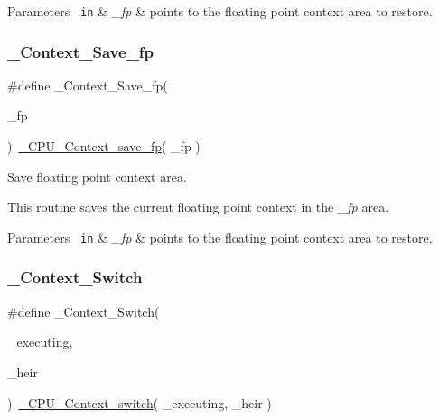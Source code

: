 \begin{DoxyParams}[1]{Parameters}
\mbox{\texttt{ in}}  & {\em \+\_\+fp} & points to the floating point context area to restore. \\
\hline
\end{DoxyParams}
\mbox{\label{group__RTEMSScoreContext_gae7f5511c583da82fa4bcf8da870ef1c2}} 
\subsubsection{\texorpdfstring{\_Context\_Save\_fp}{\_Context\_Save\_fp}}
{\footnotesize\ttfamily \#define \+\_\+\+Context\+\_\+\+Save\+\_\+fp(\begin{DoxyParamCaption}\item[{}]{\+\_\+fp }\end{DoxyParamCaption})~\mbox{\hyperlink{sparc_2include_2rtems_2score_2cpu_8h_ae8d9251a320d6920e3c8d6e45eb38fad}{\+\_\+\+C\+P\+U\+\_\+\+Context\+\_\+save\+\_\+fp}}( \+\_\+fp )}



Save floating point context area. 

This routine saves the current floating point context in the {\itshape \+\_\+fp} area.


\begin{DoxyParams}[1]{Parameters}
\mbox{\texttt{ in}}  & {\em \+\_\+fp} & points to the floating point context area to restore. \\
\hline
\end{DoxyParams}
\mbox{\label{group__RTEMSScoreContext_gac1e12323e6e85bbced3d57828b36fff8}} 
\subsubsection{\texorpdfstring{\_Context\_Switch}{\_Context\_Switch}}
{\footnotesize\ttfamily \#define \+\_\+\+Context\+\_\+\+Switch(\begin{DoxyParamCaption}\item[{}]{\+\_\+executing,  }\item[{}]{\+\_\+heir }\end{DoxyParamCaption})~\mbox{\hyperlink{group__RTEMSScoreCPUARM_gaa9f8cc989454b28232e5375e30c90970}{\+\_\+\+C\+P\+U\+\_\+\+Context\+\_\+switch}}( \+\_\+executing, \+\_\+heir )}



